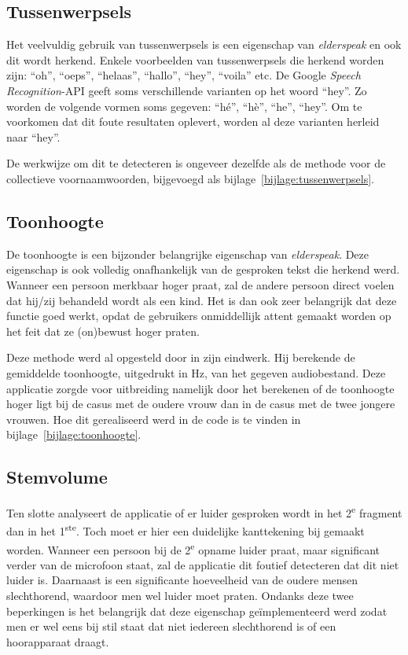 \subsection{Tussenwerpsels}
Het veelvuldig gebruik van tussenwerpsels is een eigenschap van \textit{elderspeak} en ook dit wordt herkend. Enkele voorbeelden van tussenwerpsels die herkend worden zijn: ``oh'', ``oeps'', ``helaas'', ``hallo'', ``hey'', ``voila'' etc. De Google \textit{Speech Recognition}-API geeft soms verschillende varianten op het woord ``hey''. Zo worden de volgende vormen soms gegeven: ``hé'', ``hè'', ``he'', ``hey''. Om te voorkomen dat dit foute resultaten oplevert, worden al deze varianten herleid naar ``hey''.

De werkwijze om dit te detecteren is ongeveer dezelfde als de methode voor de collectieve voornaamwoorden, bijgevoegd als bijlage~\ref{bijlage:tussenwerpsels}.

\subsection{Toonhoogte}
De toonhoogte is een bijzonder belangrijke eigenschap van \textit{elderspeak}. Deze eigenschap is ook volledig onafhankelijk van de gesproken tekst die herkend werd. Wanneer een persoon merkbaar hoger praat, zal de andere persoon direct voelen dat hij/zij behandeld wordt als een kind. Het is dan ook zeer belangrijk dat deze functie goed werkt, opdat de gebruikers onmiddellijk attent gemaakt worden op het feit dat ze (on)bewust hoger praten.

Deze methode werd al opgesteld door \textcite{Standaert2021} in zijn eindwerk. Hij berekende de gemiddelde toonhoogte, uitgedrukt in Hz, van het gegeven audiobestand. Deze applicatie zorgde voor uitbreiding namelijk door het berekenen of de toonhoogte hoger ligt bij de casus met de oudere vrouw dan in de casus met de twee jongere vrouwen.
Hoe dit gerealiseerd werd in de code is te vinden in bijlage~\ref{bijlage:toonhoogte}.

\subsection{Stemvolume}
Ten slotte analyseert de applicatie of er luider gesproken wordt in het 2\textsuperscript{e} fragment dan in het 1\textsuperscript{ste}. Toch moet er hier een duidelijke kanttekening bij gemaakt worden. Wanneer een persoon bij de 2\textsuperscript{e} opname luider praat, maar significant verder van de microfoon staat, zal de applicatie dit foutief detecteren  dat dit niet luider is. Daarnaast is een significante hoeveelheid van de oudere mensen slechthorend, waardoor men wel luider moet praten. Ondanks deze twee beperkingen is het belangrijk dat deze eigenschap geïmplementeerd werd zodat men er wel eens bij stil staat dat niet iedereen slechthorend is of een hoorapparaat draagt.

